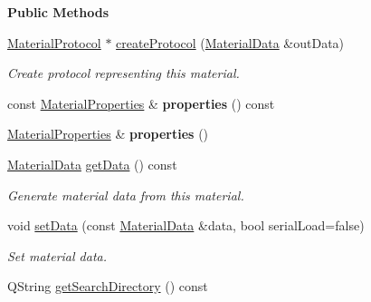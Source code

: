 \begin{Indent}\textbf{ Public Methods}\par
\begin{DoxyCompactItemize}
\item 
\mbox{\hyperlink{classrev_1_1_protocol}{Material\+Protocol}} $\ast$ \mbox{\hyperlink{classrev_1_1_material_af5481a063b935c733334c6ca74853c86}{create\+Protocol}} (\mbox{\hyperlink{structrev_1_1_material_data}{Material\+Data}} \&out\+Data)
\begin{DoxyCompactList}\small\item\em Create protocol representing this material. \end{DoxyCompactList}\item 
\mbox{\label{classrev_1_1_material_a0dfc23e18958d9834f65fe1bc596990f}} 
const \mbox{\hyperlink{structrev_1_1_material_properties}{Material\+Properties}} \& {\bfseries properties} () const
\item 
\mbox{\label{classrev_1_1_material_a3994b054e0a3d35db61d3cf5ceb67cd3}} 
\mbox{\hyperlink{structrev_1_1_material_properties}{Material\+Properties}} \& {\bfseries properties} ()
\item 
\mbox{\label{classrev_1_1_material_a61b2701ea0e64aaba4ad980185f187e2}} 
\mbox{\hyperlink{structrev_1_1_material_data}{Material\+Data}} \mbox{\hyperlink{classrev_1_1_material_a61b2701ea0e64aaba4ad980185f187e2}{get\+Data}} () const
\begin{DoxyCompactList}\small\item\em Generate material data from this material. \end{DoxyCompactList}\item 
void \mbox{\hyperlink{classrev_1_1_material_ae519114a3c9b89d1ca4d363e9aae6132}{set\+Data}} (const \mbox{\hyperlink{structrev_1_1_material_data}{Material\+Data}} \&data, bool serial\+Load=false)
\begin{DoxyCompactList}\small\item\em Set material data. \end{DoxyCompactList}\item 
\mbox{\label{classrev_1_1_material_a3bad58a67a885fe88ef24607ce232c5c}} 
Q\+String \mbox{\hyperlink{classrev_1_1_material_a3bad58a67a885fe88ef24607ce232c5c}{get\+Search\+Directory}} () const

\end{DoxyCompactItemize}
\end{Indent}

